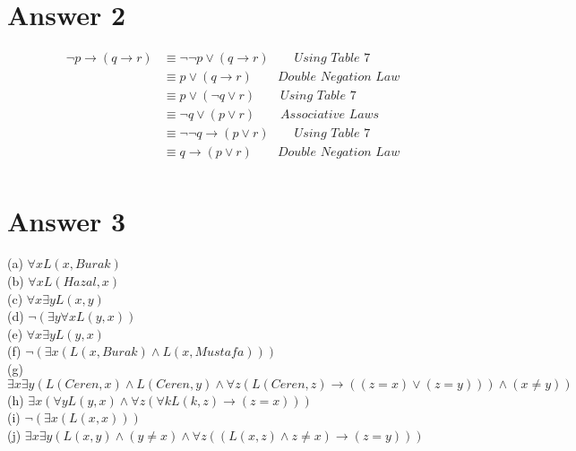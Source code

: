 \documentclass[12pt]{article}
\begin{document}
\vspace{30px}

\section*{Answer 2}
\begin{equation} 
\label{eq1}
\begin{split}
\neg p \rightarrow (q \rightarrow r) & \equiv \neg\neg p \lor (q \rightarrow r) \qquad \textit{Using Table 7} \\& \equiv p \lor (q \rightarrow r) \qquad \textit{Double Negation Law} \\& \equiv p \lor (\neg q \lor r) \qquad \textit{Using Table 7} \\& \equiv \neg q \lor (p \lor r) \qquad \textit{Associative Laws}\\& \equiv \neg\neg q \rightarrow (p \lor r) \qquad \textit{Using Table 7}\\& \equiv  q \rightarrow (p \lor r) \qquad \textit{Double Negation Law}\\
\end{split}
\end{equation}

\vspace{30px}

\section*{Answer 3}

(a) $\forall x L(x,Burak)$ \\
(b) $\forall x L(Hazal,x)$\\
(c) $\forall x \exists yL(x,y) $\\
(d) $ \neg (\exists y \forall xL(y,x) )$\\
(e) $\forall x \exists yL(y,x) $\\
(f) $\neg (\exists x (L(x,Burak) \land L(x,Mustafa) ))$\\
(g) $\exists x \exists y (L(Ceren,x)\land L(Ceren,y)\land \forall z(L(Ceren,z)\rightarrow ((z=x) \lor (z=y)))\land (x \neq y))$\\
(h) $\exists x (\forall y L(y,x)\land \forall z (\forall kL(k,z)\rightarrow (z=x)))$\\
(i) $\neg(\exists x(L(x,x)))$\\
(j) $\exists x \exists y(L(x,y)\land (y\neq x) \land \forall z ((L(x,z) \land z\neq x) \rightarrow  (z=y)))$\\

\vspace{30px}
\end{document}
